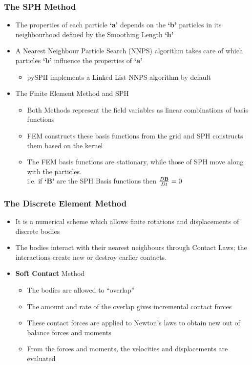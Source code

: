 \documentclass{beamer}
\begin{document}
%  
 \begin{frame} %
  \frametitle{The SPH Method}
  \begin{itemize}
   \item The properties of each particle {\bf{`a'}} depends on the {\bf{`b'}} particles in its neighbourhood defined by the Smoothing Length {\bf{`h'}} \pause
   \item A Nearest Neighbour Particle Search (NNPS) algorithm takes care of which particles {\bf{`b'}} influence the properties of {\bf{`a'}} \pause
   \begin{itemize}
    \item pySPH implements a Linked List NNPS algorithm by default\pause
   \end{itemize}
   \item The Finite Element Method and SPH
   \begin{itemize}
    \item Both Methods represent the field variables as linear combinations of basis functions \pause
    \item FEM constructs these basis functions from the grid and SPH constructs them based on the kernel \pause
    \item The FEM basis functions are stationary, while those of SPH move along with the particles.\\
    i.e. if {\bf{`B'}} are the SPH Basis functions then $\frac{D{\bf{B}}}{Dt} = 0$ 
   \end{itemize}
  \end{itemize}
 \end{frame}

 \begin{frame} %
  \frametitle{The Discrete Element Method}
  \begin{itemize}
   \item It is a numerical scheme which allows finite rotations and displacements of discrete bodies \pause
   \item The bodies interact with their nearest neighbours through Contact Laws; the interactions create new or destroy earlier contacts. \pause
   \item {\bf{Soft Contact}} Method
   \begin{itemize}
    \item The bodies are allowed to ``overlap''
    \item The amount and rate of the overlap gives incremental contact forces
    \item These contact forces are applied to Newton's laws to obtain new out of balance forces and moments
    \item From the forces and moments, the velocities and displacements are evaluated
   \end{itemize}
  \end{itemize}
 \end{frame}
\end{document}
